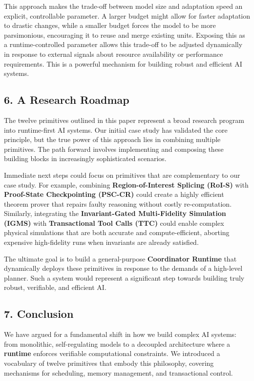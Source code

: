 \documentclass[
]{article}
\begin{document}
This approach makes the trade-off between model size and adaptation
speed an explicit, controllable parameter. A larger budget might allow
for faster adaptation to drastic changes, while a smaller budget forces
the model to be more parsimonious, encouraging it to reuse and merge
existing units. Exposing this as a runtime-controlled parameter allows
this trade-off to be adjusted dynamically in response to external
signals about resource availability or performance requirements. This is
a powerful mechanism for building robust and efficient AI systems.

\hypertarget{a-research-roadmap}{%
\subsection{6. A Research Roadmap}\label{a-research-roadmap}}

The twelve primitives outlined in this paper represent a broad research
program into runtime-first AI systems. Our initial case study has
validated the core principle, but the true power of this approach lies
in combining multiple primitives. The path forward involves implementing
and composing these building blocks in increasingly sophisticated
scenarios.

Immediate next steps could focus on primitives that are complementary to
our case study. For example, combining \textbf{Region-of-Interest
Splicing (RoI-S)} with \textbf{Proof-State Checkpointing (PSC-CR)} could
create a highly efficient theorem prover that repairs faulty reasoning
without costly re-computation. Similarly, integrating the
\textbf{Invariant-Gated Multi-Fidelity Simulation (IGMS)} with
\textbf{Transactional Tool Calls (TTC)} could enable complex physical
simulations that are both accurate and compute-efficient, aborting
expensive high-fidelity runs when invariants are already satisfied.

The ultimate goal is to build a general-purpose \textbf{Coordinator
Runtime} that dynamically deploys these primitives in response to the
demands of a high-level planner. Such a system would represent a
significant step towards building truly robust, verifiable, and
efficient AI.

\hypertarget{conclusion}{%
\subsection{7. Conclusion}\label{conclusion}}

We have argued for a fundamental shift in how we build complex AI
systems: from monolithic, self-regulating models to a decoupled
architecture where a \textbf{runtime} enforces verifiable computational
constraints. We introduced a vocabulary of twelve primitives that embody
this philosophy, covering mechanisms for scheduling, memory management,
and transactional control.
\end{document}
